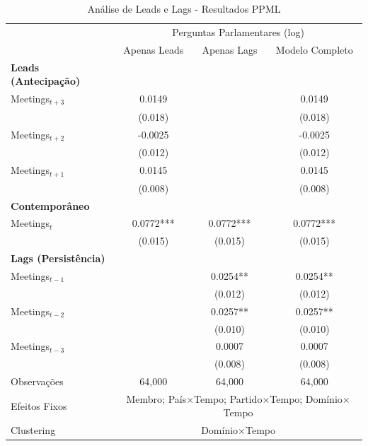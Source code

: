\begin{table}[htbp]
    \centering
    \caption{Análise de Leads e Lags - Resultados PPML}
    \label{tab:leads_lags_main}
    \begin{tabular}{lccc}
        \toprule
        & \multicolumn{3}{c}{Perguntas Parlamentares (log)} \\
        \cmidrule(lr){2-4}
        & Apenas Leads & Apenas Lags & Modelo Completo \\
        \midrule
        \textbf{Leads (Antecipação)} & & & \\
        Meetings$_{t+3}$ & 0.0149 & & 0.0149 \\
        & (0.018) & & (0.018) \\
        Meetings$_{t+2}$ & -0.0025 & & -0.0025 \\
        & (0.012) & & (0.012) \\
        Meetings$_{t+1}$ & 0.0145 & & 0.0145 \\
        & (0.008) & & (0.008) \\
        \midrule
        \textbf{Contemporâneo} & & & \\
        Meetings$_{t}$ & 0.0772*** & 0.0772*** & 0.0772*** \\
        & (0.015) & (0.015) & (0.015) \\
        \midrule
        \textbf{Lags (Persistência)} & & & \\
        Meetings$_{t-1}$ & & 0.0254** & 0.0254** \\
        & & (0.012) & (0.012) \\
        Meetings$_{t-2}$ & & 0.0257** & 0.0257** \\
        & & (0.010) & (0.010) \\
        Meetings$_{t-3}$ & & 0.0007 & 0.0007 \\
        & & (0.008) & (0.008) \\
        \midrule
        Observações & 64,000 & 64,000 & 64,000 \\
        Efeitos Fixos & \multicolumn{3}{c}{Membro; País$\times$Tempo; Partido$\times$Tempo; Domínio$\times$Tempo} \\
        Clustering & \multicolumn{3}{c}{Domínio$\times$Tempo} \\
        \bottomrule
    \end{tabular}
\end{table}

